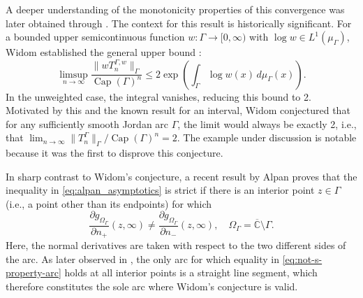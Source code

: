 \documentclass[12pt,oneside,reqno]{amsart}
\theoremstyle{definition}
\numberwithin{equation}{section}
\newcommand{\C}{{\mathbb C}}
\newcommand{\RS}{\overline{\C}}
\renewcommand{\Cap}{\operatorname{Cap}}
\begin{document}
A deeper understanding of the monotonicity properties of this convergence was later obtained through \cite[Theorem 8]{schiefermayr-zinchenko21}. The context for this result is historically significant. For a bounded upper semicontinuous function $w:\Gamma\rightarrow [0,\infty)$ with $\log w \in L^1(\mu_\Gamma)$, Widom established the general upper bound \cite[Theorem 11.4]{widom69}:
\begin{equation}
\limsup_{n \to \infty} \frac{\|wT_n^{\Gamma,w}\|_{\Gamma}}{\Cap(\Gamma)^n} \leq 2\exp\left(\int_{\Gamma} \log w(x) \, d\mu_{\Gamma}(x)\right).
\label{eq:alpan_asymptotics}
\end{equation}
In the unweighted case, the integral vanishes, reducing this bound to 2. Motivated by this and the known result for an interval, Widom conjectured that for any sufficiently smooth Jordan arc $\Gamma$, the limit would always be exactly 2, i.e., that $\lim_{n\rightarrow \infty}\|T_n^{\Gamma}\|_{\Gamma}/\Cap(\Gamma)^n = 2$. The example under discussion is notable because it was the first to disprove this conjecture.

In sharp contrast to Widom's conjecture, a recent result by Alpan \cite[Theorem 1.3]{alpan22} proves that the inequality in \eqref{eq:alpan_asymptotics} is strict if there is an interior point $z\in \Gamma$ (i.e., a point other than its endpoints) for which
\begin{equation}
\frac{\partial g_{\Omega_\Gamma}}{\partial n_+}(z,\infty) \neq \frac{\partial g_{\Omega_\Gamma}}{\partial n_-}(z,\infty), \quad \Omega_\Gamma = \RS\setminus \Gamma.
\label{eq:not-s-property-arc}
\end{equation}
Here, the normal derivatives are taken with respect to the two different sides of the arc. As later observed in \cite[Theorem 1.1]{christiansen-eichinger-rubin23}, the only arc for which equality in \eqref{eq:not-s-property-arc} holds at all interior points is a straight line segment, which therefore constitutes the sole arc where Widom's conjecture is valid.

\end{document}
